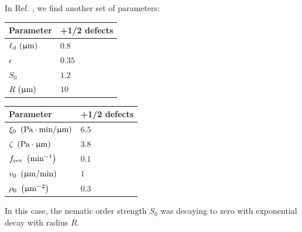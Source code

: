\documentclass[a5paper]{article}
\begin{document}
In Ref. \cite{han2025local}, we find another set of parameters:

\noindent
\begin{tabular}[t]{|l|l|}
    \hline Parameter & +1/2 defects  
    \\ \hline 
    $\ell_{\rm d}~(\upmu\mathrm{m})$ & $0.8$ 
    \\ \hline 
    $\epsilon$ & $0.35$
    \\ \hline 
    $S_0$ & $1.2$
    \\ \hline
    $R ~(\upmu\mathrm{m})$ & $10$
    \\ \hline
\end{tabular}
\hspace{1cm}
\begin{tabular}[t]{|l|l|}
    \hline Parameter & +1/2 defects
    \\ \hline
    $\xi_0 ~\left(\text{Pa} \cdot \text{min} / \upmu\mathrm{m}\right)$ & $6.5$
    \\ \hline 
    $\zeta~ \left(\text{Pa} \cdot \upmu\mathrm{m}\right)$ & $3.8$
    \\ \hline
    $f_{\rm rev}~\left(\text{min}^{-1}\right)$ & $0.1$
    \\ \hline
    $v_0~\left(\upmu\mathrm{m} / \text{min}\right)$ & $1$
    \\ \hline
    $\rho_0~\left(\upmu\mathrm{m}^{-2}\right)$ & $0.3$
    \\ \hline
\end{tabular}

In this case, the nematic order strength $S_0$ was decaying to zero with exponential decay with radius $R$.


\end{document}
